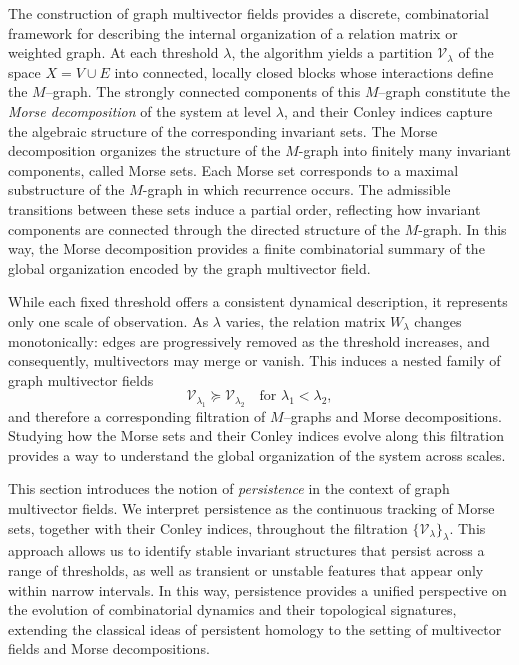 \documentclass{article}
\theoremstyle{definition}
\theoremstyle{plain}
\theoremstyle{remark}
\newcommand{\1}{\mathbbm{1}}  %
\begin{document}
  

The construction of graph multivector fields provides a discrete,
combinatorial framework for describing the internal organization of a
relation matrix or weighted graph.
At each threshold $\lambda$, the algorithm yields a partition
$\mathcal{V}_\lambda$ of the space $X=V\cup E$ into connected,
locally closed blocks whose interactions define the $M$--graph.
The strongly connected components of this $M$--graph constitute the
\emph{Morse decomposition} of the system at level $\lambda$, and their
Conley indices capture the algebraic structure of the corresponding
invariant sets.
The Morse decomposition organizes the structure of the $M$-graph into finitely many
invariant components, called Morse sets. Each Morse set corresponds to a maximal
substructure of the $M$-graph in which recurrence occurs. The admissible transitions
between these sets induce a partial order, reflecting how invariant components
are connected through the directed structure of the $M$-graph. In this way,
the Morse decomposition provides a finite combinatorial summary of the global
organization encoded by the graph multivector field.

While each fixed threshold offers a consistent dynamical description,
it represents only one scale of observation.  
As $\lambda$ varies, the relation matrix $W_\lambda$ changes
monotonically: edges are progressively removed as the threshold increases,
and consequently, multivectors may merge or vanish.  
This induces a nested family of graph multivector fields
\[
  \mathcal{V}_{\lambda_1} \succeq \mathcal{V}_{\lambda_2}
  \quad \text{for } \lambda_1 < \lambda_2,
\]
and therefore a corresponding filtration of $M$--graphs and Morse
decompositions.  
Studying how the Morse sets and their Conley indices evolve along this
filtration provides a way to understand the global organization of the
system across scales.

This section introduces the notion of \emph{persistence} in the context of
graph multivector fields.  
We interpret persistence as the continuous tracking of Morse sets,
together with their Conley indices, throughout the filtration
$\{\mathcal{V}_\lambda\}_\lambda$.  
This approach allows us to identify stable invariant structures that
persist across a range of thresholds, as well as transient or unstable
features that appear only within narrow intervals.  
In this way, persistence provides a unified perspective on the evolution of
combinatorial dynamics and their topological signatures, extending the
classical ideas of persistent homology to the setting of multivector
fields and Morse decompositions.
\end{document}
